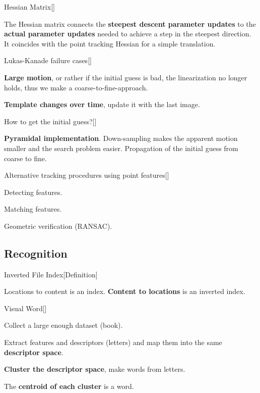 \documentclass[10pt,a4paper]{scrartcl}
\begin{document}
\begin{multicols*}{2}
\begin{QandA}{Hessian Matrix}[\Derivation]
\item The Hessian matrix connects the \textbf{steepest descent parameter updates} to the \textbf{actual parameter updates} needed to achieve a step in the steepest direction. It coincides with the point tracking Hessian for a simple translation.
\end{QandA}

\begin{QandA}{Lukas-Kanade failure cases}[\Application]
\item \textbf{Large motion}, or rather if the initial guess is bad, the linearization no longer holds, thus we make a coarse-to-fine-approach.
\item \textbf{Template changes over time}, update it with the last image.
\end{QandA}

\begin{QandA}{How to get the initial guess?}[\Application]
\item \textbf{Pyramidal implementation}. Down-sampling makes the apparent motion smaller and the search problem easier. Propagation of the initial guess from coarse to fine.
\end{QandA}

\begin{QandA}
{Alternative tracking procedures using point features}[\Application]
\item Detecting features.
\item Matching features.
\item Geometric verification (RANSAC).
\end{QandA}

\subsection*{Recognition}

\begin{QandA}{Inverted File Index}[Definition]
\item Locations to content is an index. \textbf{Content to locations} is an inverted index. 
\end{QandA}

\begin{QandA}{Visual Word}[\Definition]
\item Collect a large enough dataset (book).
\item Extract features and descriptors (letters) and map them into the same \textbf{descriptor space}.
\item \textbf{Cluster the descriptor space}, make words from letters.
\item The \textbf{centroid of each cluster} is a word.
\end{QandA}


\end{multicols*}
\end{document}
